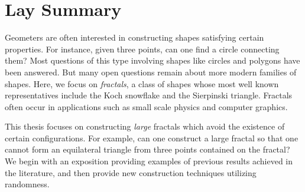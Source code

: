 


\chapter{Lay Summary}



Geometers are often interested in constructing shapes satisfying certain properties. For instance, given three points, can one find a circle connecting them? Most questions of this type involving shapes like circles and polygons have been answered. But many open questions remain about more modern families of shapes. Here, we focus on \emph{fractals}, a class of shapes whose most well known representatives include the Koch snowflake and the Sierpinski triangle. Fractals often occur in applications such as small scale physics and computer graphics.

This thesis focuses on constructing \emph{large} fractals which avoid the existence of certain configurations. For example, can one construct a large fractal so that one cannot form an equilateral triangle from three points contained on the fractal? We begin with an exposition providing examples of previous results achieved in the literature, and then provide new construction techniques utilizing randomness.